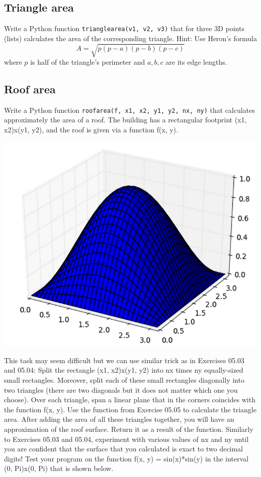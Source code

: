 \subsection{Triangle area}

Write a Python function {\tt trianglearea(v1, v2, v3)} that for three 3D points (lists) 
calculates the area of the corresponding triangle. Hint: Use Heron's formula 
$$
A = \sqrt{p(p-a)(p-b)(p-c)}
$$
where $p$ is half of the triangle's perimeter and $a, b, c$ are its edge lengths. 


\subsection{Roof area}

Write a Python function {\tt roofarea(f, x1, x2, y1, y2, nx, ny)} that calculates approximately the area of a roof. 
The building has a rectangular footprint (x1, x2)x(y1, y2), and the roof is given via a function f(x, y). 

\begin{center}
\includegraphics[height=0.5\textwidth]{img/area-1.png}
\end{center}
\noindent
This task 
may seem difficult but we can use similar trick as in Exercises 05.03 and 05.04: Split the rectangle 
(x1, x2)x(y1, y2) into nx times ny equally-sized small rectangles. Moreover, split each of these small rectangles 
diagonally into two triangles (there are two diagonals but it does not matter which one you choose). Over each 
triangle, span a linear plane that in the corners coincides with the function f(x, y). Use the function from Exercise 
05.05 to calculate the triangle area. After adding the area of 
all these triangles together, you will have an approximation of the roof surface. Return it as a result of the function. 
Similarly to Exercises 05.03 and 05.04, experiment with various values of nx and 
ny until you are confident that the surface that you 
calculated is exact to two decimal digits! Test your program on the function f(x, y) = sin(x)*sin(y) in the interval
(0, Pi)x(0, Pi) that is shown below.

